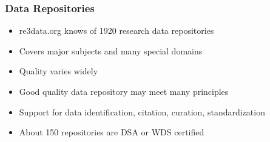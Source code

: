\documentclass{beamer}
\begin{document}
\begin{frame}
  \frametitle{Data Repositories}
  
  \begin{itemize}
  \item re3data.org knows of 1920 research data repositories
  \item Covers major subjects and many special domains
  \item Quality varies widely
  \item Good quality data repository may meet many principles
  \item Support for data identification, citation, curation, standardization
  \item About 150 repositories are DSA or WDS certified
  \end{itemize}
\end{frame}

{
	\begin{frame}[plain]
	\end{frame}
}
\end{document}
